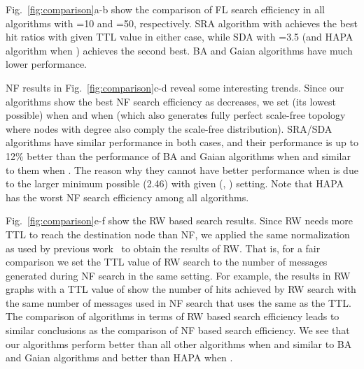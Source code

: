 \documentclass[10pt,journal,cspaper,compsoc]{IEEEtran}
\begin{document}
Fig.~\ref{fig:comparison}a-b show the comparison of FL search efficiency in all algorithms with =10 and =50, respectively. SRA algorithm with  achieves the best hit ratios with given TTL value in either case, while SDA with =3.5 (and HAPA algorithm when ) achieves the second best. BA and Gaian algorithms have much lower performance. 



NF results in Fig.~\ref{fig:comparison}c-d reveal some interesting trends. Since our algorithms show the best NF search efficiency as  decreases, we set  (its lowest possible) when  and  when  (which also generates fully perfect scale-free topology where nodes with degree  also comply the scale-free distribution). SRA/SDA algorithms have similar performance in both cases, and their performance is up to 12\% better than the performance of BA and Gaian algorithms when  and similar to them when . The reason why they cannot have better performance when  is due to the larger minimum possible  (2.46) with given (, ) setting. Note that HAPA has the worst NF search efficiency among all algorithms.
 




Fig.~\ref{fig:comparison}e-f show the RW based search results. Since RW needs more TTL to reach the destination node than NF, we applied the same normalization as used by previous work~\cite{guclu} to obtain the results of RW. That is, for a fair comparison we set the TTL value of RW search to the number of messages generated during NF search in the same setting. For example, the results in RW graphs with a TTL value of  show the number of hits achieved by RW search with the same number of messages used in NF search that uses the same  as the TTL. The comparison of algorithms in terms of RW based search efficiency leads to similar conclusions as the comparison of NF based search efficiency. We see that our algorithms perform better than all other algorithms when  and similar to BA and Gaian algorithms and better than HAPA when .
\end{document}
